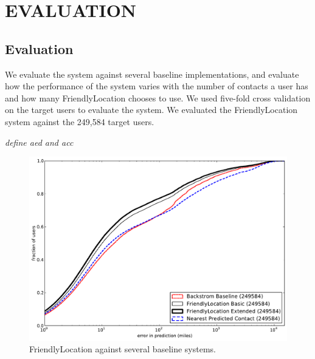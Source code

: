 \ifdefined\THESIS
    \chapter{\uppercase{Evaluation}}
    \label{chap:eval}
\else
    \section{Evaluation}
\fi

We evaluate the system against several baseline implementations, and evaluate
how the performance of the system varies with the number of contacts a user has
and how many FriendlyLocation chooses to use.
We used five-fold cross validation on the target users to evaluate the system.
We evaluated the FriendlyLocation system against the 249,584 target users.

\emph{define aed and acc}

\begin{figure}[tb]
\centering
\includegraphics[width=\linewidth]{figures/fl_basic.pdf}
\caption{
    FriendlyLocation against several baseline systems.
}
\label{fig:baseline}
\end{figure}


